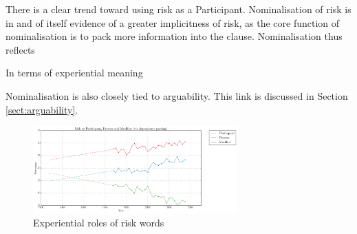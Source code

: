 
    There is a clear trend toward using risk as a Participant.
     Nominalisation of risk is in and of itself evidence of a greater implicitness of risk, as the core function of nominalisation is to pack more information into the clause. Nominalisation thus reflects 


    In terms of experiential meaning

    Nominalisation is also closely tied to arguability. This link is discussed in Section \ref{sect:arguability}.




            \begin{figure}[htb!]
            \centering
            \includegraphics[width=0.7\textwidth]{../images/risk-as-participant-process-and-modifier-via-dependency-parsing.png}
           \caption{Experiential roles of risk words}
                \label{fig:funcrole}
            \end{figure}

		

